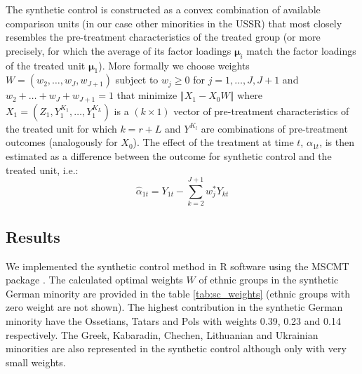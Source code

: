 The synthetic control is  constructed as a convex combination of available comparison units (in our case other minorities in the USSR) that most closely resembles the pre-treatment characteristics of the treated group
 (or more precisely, for which the average of its factor loadings $\boldsymbol{\mu}_i$ match the factor loadings of the treated unit  $\boldsymbol{\mu}_1$). 
 More formally we choose weights $W = (w_2, \dots, w_J, w_{J+1})$ subject to $w_j \geq 0$ for $j = 1, \dots, J, J + 1$ and $w_2 +  \dots + w_J + w_{J+1} = 1$ that minimize $\left\Vert X_1 - X_0 W \right\Vert$ where $X_1 = (Z_1, Y_1^{K_1}, \dots, Y_1^{K_L})$ is a $(k \times 1)$ vector of pre-treatment characteristics of the treated unit for which $k = r + L$ and $Y^{K_l}$ are combinations of
pre-treatment outcomes (analogously for $X_0$). The effect of the treatment at time $t$, $\alpha_{1t}$, is then estimated as a difference between the outcome for synthetic control and the treated unit, i.e.:
\begin{equation*}
  \hat\alpha_{1t}  = Y_{1t} - \sum_{k = 2}^{J + 1} w_j^* Y_{kt}
\end{equation*}

\subsection{Results}
We implemented the synthetic control method in R software using the MSCMT package \citep{becker_fast_2018}. The calculated optimal weights $W$ of ethnic groups in the synthetic German minority are provided in the table \ref{tab:sc_weights} (ethnic groups with zero weight are not shown). The highest contribution in the synthetic German minority have the Ossetians, Tatars and Pols with weights 0.39, 0.23 and 0.14 respectively. The Greek, Kabaradin, Chechen, Lithuanian and Ukrainian minorities are also represented in the synthetic control although only with very small weights. 



